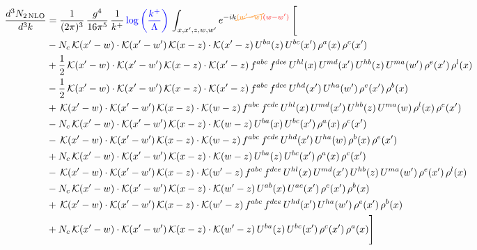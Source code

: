 \documentclass[9pt]{article}
\numberwithin{equation}{section}
\begin{document}
\begin{align}
\frac{d^{3}N_{2\,\mathrm{NLO}}}{d^{3}k} & = \frac{1}{(2\pi)^{3}}\,\frac{g^{4}}{16\pi^{5}}\,\frac{1}{k^{+}}\,{\color{blue}\log{\left(\frac{k^{+}}{\Lambda}\right)}}\,\int_{x,x',z,w,w'}e^{-ik{\color{orange}\cancel{(w'-w)}}{\color{red}(w-w')}}\,\Bigg[\notag\\ & -N_{c}\,\mathcal{K}(x'-w)\cdot\mathcal{K}(x'-w')\,\mathcal{K}(x-z)\cdot\mathcal{K}(x'-z)\,U^{ba}(z)\,U^{bc}(x')\,\rho^{a}(x)\,\rho^{c}(x')\notag\\
& +\frac{1}{2}\,\mathcal{K}(x'-w)\cdot\mathcal{K}(x'-w')\,\mathcal{K}(x-z)\cdot\mathcal{K}(x'-z)\,f^{abc}\,f^{dce}\,U^{hl}(x)\,U^{md}(x')\,U^{hb}(z)\,U^{ma}(w')\,\rho^{e}(x')\,\rho^{l}(x)\notag\\
& -\frac{1}{2}\,\mathcal{K}(x'-w)\cdot\mathcal{K}(x'-w')\,\mathcal{K}(x-z)\cdot\mathcal{K}(x'-z)\,f^{abc}\,f^{dce}\,U^{hd}(x')\,U^{ha}(w')\,\rho^{e}(x')\,\rho^{b}(x)\notag\\
& +\,\mathcal{K}(x'-w)\cdot\mathcal{K}(x'-w')\,\mathcal{K}(x-z)\cdot\mathcal{K}(w-z)\,f^{abc}\,f^{cde}\,U^{hl}(x)\,U^{md}(x')\,U^{hb}(z)\,U^{ma}(w)\,\rho^{l}(x)\,\rho^{e}(x')\notag\\
& -N_{c}\,\mathcal{K}(x'-w)\cdot\mathcal{K}(x'-w')\,\mathcal{K}(x-z)\cdot\mathcal{K}(w-z)\,U^{ba}(x)\,U^{bc}(x')\,\rho^{a}(x)\,\rho^{c}(x')\notag\\
& -\,\mathcal{K}(x'-w)\cdot\mathcal{K}(x'-w')\,\mathcal{K}(x-z)\cdot\mathcal{K}(w-z)\,f^{abc}\,f^{cde}\,U^{hd}(x')\,U^{ha}(w)\,\rho^{b}(x)\,\rho^{e}(x')\notag\\
& +N_{c}\,\mathcal{K}(x'-w)\cdot\mathcal{K}(x'-w')\,\mathcal{K}(x-z)\cdot\mathcal{K}(w-z)\,U^{ba}(z)\,U^{bc}(x')\,\rho^{a}(x)\,\rho^{c}(x')\notag\\
& -\,\mathcal{K}(x'-w)\cdot\mathcal{K}(x'-w')\,\mathcal{K}(x-z)\cdot\mathcal{K}(w'-z)\,f^{abc}\,f^{dce}\,U^{hl}(x)\,U^{md}(x')\,U^{hb}(z)\,U^{ma}(w')\,\rho^{e}(x')\,\rho^{l}(x)\notag\\
& -N_{c}\,\mathcal{K}(x'-w)\cdot\mathcal{K}(x'-w')\,\mathcal{K}(x-z)\cdot\mathcal{K}(w'-z)\,U^{ab}(x)\,U^{ac}(x')\,\rho^{c}(x')\,\rho^{b}(x)\notag\\
& +\,\mathcal{K}(x'-w)\cdot\mathcal{K}(x'-w')\,\mathcal{K}(x-z)\cdot\mathcal{K}(w'-z)\,f^{abc}\,f^{dce}\,U^{hd}(x')\,U^{ha}(w')\,\rho^{e}(x')\,\rho^{b}(x)\notag\\
& +N_{c}\,\mathcal{K}(x'-w)\cdot\mathcal{K}(x'-w')\,\mathcal{K}(x-z)\cdot\mathcal{K}(w'-z)\,U^{ba}(z)\,U^{bc}(x')\,\rho^{c}(x')\,\rho^{a}(x)\Bigg]
\end{align}
\end{document}
